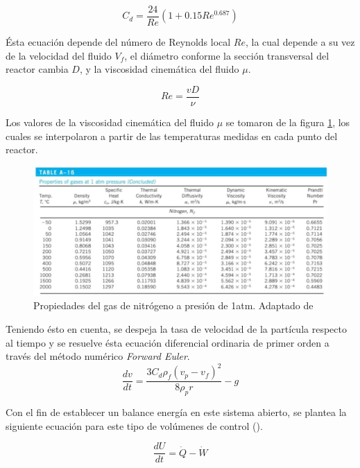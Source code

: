 \documentclass[11pt,stdletter,orderfromtodate,sigleft,twoside]{report}
\begin{document}
\begin{equation}
    C_{d}=\frac{24}{Re}(1+0.15Re^{0.687})
    \label{Coefarras}
\end{equation}

Ésta ecuación depende del número de Reynolds local $Re$, la cual depende a su vez de la velocidad del fluido $V_f$, el diámetro conforme la sección transversal del reactor cambia $D$, y la viscosidad cinemática del fluido $\mu$. 

\begin{equation}
    Re=\frac{vD}{\nu}
    \label{Re}
\end{equation}

Los valores de la viscosidad cinemática del fluido $\mu$ se tomaron de la figura \ref{Tabla propiedades}, los cuales se interpolaron a partir de las temperaturas medidas en cada punto del reactor.

\begin{figure}[H]
    \centering
    \includegraphics[width=0.7\linewidth]{figures/Imagen de WhatsApp 2025-05-10 a las 16.24.18_a4e1269a.jpg}
    \caption{Propiedades del gas de nitrógeno a presión de 1atm. Adaptado de \cite{cengel2013ebook}}
    \label{Tabla propiedades}
\end{figure}

Teniendo ésto en cuenta, se despeja la tasa de velocidad de la partícula respecto al tiempo y se resuelve ésta ecuación diferencial ordinaria de primer orden a través del método numérico \textit{Forward Euler}.
\begin{equation}
    \frac{dv}{dt}=\frac{3C_{d}\rho_{f}(v_{p}-v_{f})^{2}}{8\rho_{p}r}-g
\end{equation}

Con el fin de establecer un balance energía en este sistema abierto, se plantea la siguiente ecuación para este tipo de volúmenes de control (\cite{moran2010fundamentals}).

\begin{equation}
    \frac{dU}{dt}=\dot{Q}-\dot{W}
    \label{1Ley}
\end{equation}
\end{document}
